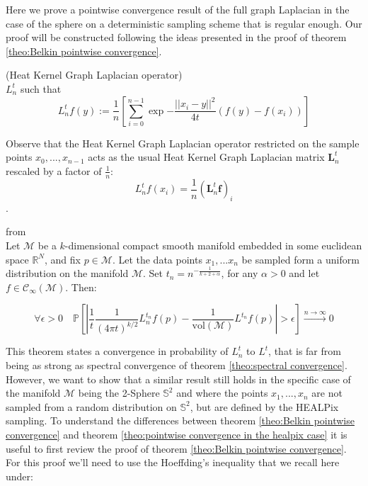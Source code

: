 \label{sec:Chapter2:pointwise convergence of the Heat Kernel Graph Laplacian on the Sphere}
Here we prove a pointwise convergence result of the full graph Laplacian in the case of the sphere on a deterministic sampling scheme that is regular enough. Our proof will be constructed following the ideas presented in the proof of theorem \ref{theo:Belkin pointwise convergence}.
\vspace{0.5cm}
\begin{definition}{}(Heat Kernel Graph Laplacian operator)\\
	\label{def:Heat Kernel Graph Laplacian operator}
	$L_n^t$ such that
	$$L_n^tf(y) := \frac{1}{n}\left[ \sum_{i=0}^{n-1} \exp{-\frac{||x_i-y||^2}{4t}}\left(f(y)-f(x_i)\right)\right]$$
\end{definition}
\vspace{0.5cm}
Observe that the Heat Kernel Graph Laplacian operator restricted on the sample points $x_0, ..., x_{n-1}$ acts as the usual Heat Kernel Graph Laplacian matrix $\mathbf L_n^t$ rescaled by a factor of $\frac{1}{n}$:
$$L_n^tf(x_i) = \frac{1}{n} (\mathbf L_n^t\mathbf f)_i$$.
\vspace{0.5cm}
\begin{snugshade*}
\begin{theorem}{from \cite[Belkin et al.]{Belkin:2005:TTF:2138147.2138189}}\\
	\label{theo:Belkin pointwise convergence}
	Let $\mathcal M$ be a $k$-dimensional compact smooth manifold embedded in some euclidean space $\mathbb R^N$, and fix $p\in\mathcal M$. Let the data points $x_1, ... x_n$ be sampled form a uniform distribution on the manifold $\mathcal M$. Set $t_n=n^{-\frac{1}{k+2+\alpha}}$, for any $\alpha>0$ and let $f\in\mathcal C_\infty(\mathcal M)$. Then:
	
	$$\forall \epsilon>0\quad \mathbb{P}\left[\left|\frac{1}{t}\frac{1}{(4 \pi t)^{k/2}}L_{n}^{t_n} f(p)-  \frac{1}{\text{vol}(\mathcal M)}L^{t_n} f(p)\right|>\epsilon\right] \xrightarrow{n\to\infty} 0$$
\end{theorem}
\end{snugshade*}
\vspace{0.5cm}
This theorem states a convergence in probability of $L_n^t$ to $L^t$, that is far from being as strong as spectral convergence of theorem \ref{theo:spectral convergence}. However, we want to show that a similar result still holds in the specific case of the manifold $\mathcal M$ being the 2-Sphere $\mathbb S^2$ and where the points $x_1, ..., x_n$ are not sampled from a random distribution on $\mathbb S^2$, but are defined by the HEALPix sampling. To understand the differences between theorem \ref{theo:Belkin pointwise convergence} and theorem \ref{theo:pointwise convergence in the healpix case} it is useful to first review the proof of theorem \ref{theo:Belkin pointwise convergence}. For this proof we'll need to use the Hoeffding's inequality that we recall here under:


